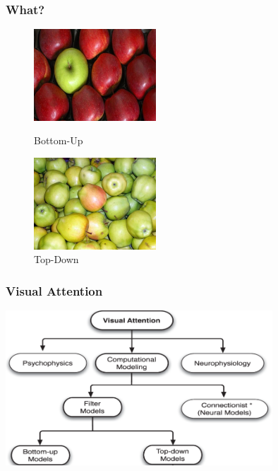 \documentclass[notheorems,serif,table,compress]{beamer}  %
\begin{document}
\begin{frame}
\frametitle{What?}
%  

\begin{figure}[!ht]
  \begin{minipage}[t]{0.46\textwidth}
  \includegraphics[width=1.8in]{apple1}
  \caption{Bottom-Up}
  \end{minipage}
  \begin{minipage}[t]{0.46\textwidth}
  \includegraphics[width=1.8in]{apple2}
  \caption{Top-Down}
  \end{minipage}
  \end{figure} 
\end{frame}


\begin{frame}
\frametitle{Visual Attention}
\centering\includegraphics[width=10cm]{VisualAttention}
\end{frame}
\end{document}
